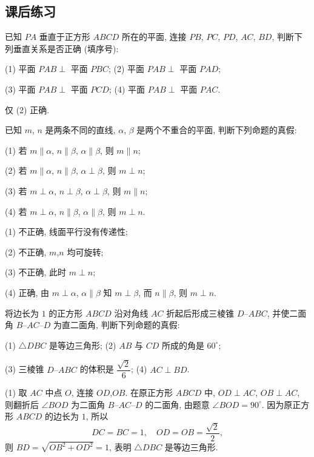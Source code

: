 \subsection{课后练习}  
\begin{exercise}
    已知 $PA$ 垂直于正方形 $ABCD$ 所在的平面, 连接 $PB$, $PC$, $PD$, $AC$, $BD$, 判断下列垂直关系是否正确 (填序号):
    
    (1) 平面 $PAB\perp$ 平面 $PBC$;\qquad
    (2) 平面 $PAB\perp$ 平面 $PAD$;
    
    (3) 平面 $PAB\perp$ 平面 $PCD$;\qquad
    (4) 平面 $PAB\perp$ 平面 $PAC$.
\end{exercise}
\beginsolution
    仅 (2) 正确.
\endsolution

\begin{exercise}
    已知 $m$, $n$ 是两条不同的直线, $\alpha$, $\beta$ 是两个不重合的平面, 判断下列命题的真假:
    
    (1) 若 $m\parallel \alpha$, $n\parallel \beta$, $\alpha \parallel \beta$, 则 $m\parallel n$;
    
    (2) 若 $m\parallel \alpha$, $n\parallel \beta$, $\alpha \perp\beta$, 则 $m\perp n$;
    
    (3) 若 $m\perp\alpha$, $n\perp\beta$, $\alpha \perp\beta$, 则 $m\parallel n$;
    
    (4) 若 $m\perp\alpha$, $n\parallel \beta$, $\alpha \parallel \beta$, 则 $m\perp n$.
\end{exercise}
\beginsolution
    (1) 不正确, 线面平行没有传递性;

    (2) 不正确, $m$,$n$ 均可旋转;

    (3) 不正确, 此时 $m\perp n$;

    (4) 正确, 由 $m\perp\alpha$, $\alpha\parallel\beta$ 知 $m\perp\beta$, 而 $n\parallel \beta$, 则 $m\perp n$.
\endsolution

\begin{exercise}
    将边长为 $1$ 的正方形 $ABCD$ 沿对角线 $AC$ 折起后形成三棱锥 $D\text{--}ABC$, 并使二面角 $B\text{--}AC\text{--}D$ 为直二面角, 判断下列命题的真假:
    
    (1) $\triangle DBC$ 是等边三角形; \qquad 
    (2) $AB$ 与 $CD$ 所成的角是 $60^\circ$;
    
    (3) 三棱锥 $D\text{--}ABC$ 的体积是 $\dfrac{\sqrt2}6$;\qquad
    (4) $AC\perp BD$.
\end{exercise}
\beginsolution
    (1) 取 $AC$ 中点 $O$, 连接 $OD$,$OB$. 在原正方形 $ABCD$ 中, $OD\perp AC$, $OB\perp AC$, 则翻折后 $\angle BOD$ 为二面角 $B\text{--}AC\text{--}D$ 的二面角, 由题意 $\angle BOD= 90^\circ$. 因为原正方形 $ABCD$ 的边长为 $1$, 所以
    \[DC=BC=1,\quad OD=OB=\frac{\sqrt2}2,\]
    则 $BD=\sqrt{OB^2+OD^2}=1$, 表明 $\triangle DBC$ 是等边三角形.

